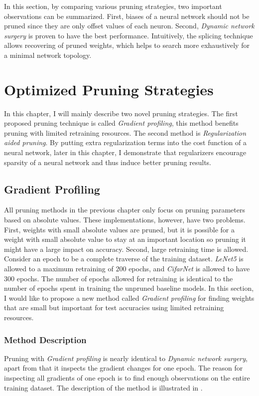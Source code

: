 \documentclass[a4paper,12pt]{report}
\begin{document}
In this section, by comparing various pruning strategies, two important observations can be
summarized.
First, biases of a neural network should not be pruned since they are only offset
values of each neuron.
Second, \textit{Dynamic network surgery} is proven to have the best performance.
Intuitively, the splicing technique allows recovering of pruned weights, which helps
to search more exhaustively for a minimal network topology.

\chapter{Optimized Pruning Strategies}
In this chapter, I will mainly describe two novel pruning strategies.
The first proposed pruning technique is called \textit{Gradient profiling},
this method benefits pruning with limited retraining resources.
The second method is \textit{Regularization aided pruning}.
By putting extra regularization terms into the cost function of a neural network,
later in this
chapter, I demonstrate that regularizers encourage sparsity of a neural network and thus
induce better pruning results.

\section{Gradient Profiling}
All pruning methods in the previous chapter only focus on pruning parameters based
on absolute values.
These implementations, however, have two problems.
First, weights with small absolute values
are pruned, but it is possible for a weight with small absolute value to stay at an important location
so pruning it might have a large impact on accuracy.
Second, large retraining time is allowed.
Consider an epoch to be a complete traverse of the training dataset.
\textit{LeNet5} is allowed to a maximum retraining of $200$ epochs, and
\textit{CifarNet} is allowed to have $300$ epochs.
The number of epochs allowed for retraining is identical to the number of epochs
spent in training the unpruned baseline models.
In this section, I would like to propose a new method called \textit{Gradient profiling}
for finding weights that are small but important for test accuracies using
limited retraining resources.

\subsection{Method Description}
Pruning with \textit{Gradient profiling} is nearly identical to \textit{Dynamic
network surgery},
apart from that it inspects the gradient changes for one epoch.
The reason for inspecting all gradients of one epoch is to find enough
observations
on the entire training dataset.
The description of the method is illustrated in .
\end{document}
